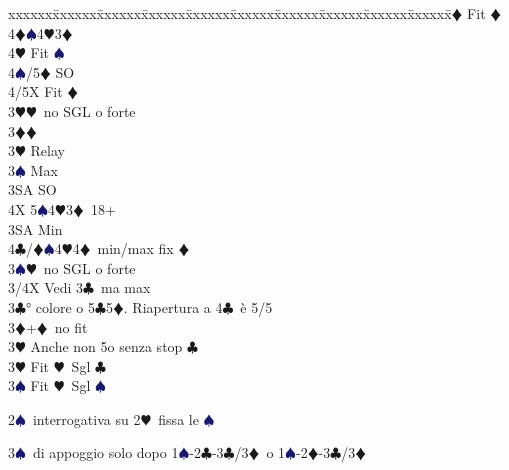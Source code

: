 \documentclass[a4paper,italian]{article}
\newcommand{\BC}{\textcolor{OliveGreen}{$\clubsuit$}}
\newcommand{\BD}{\textcolor{RedOrange}{$\vardiamondsuit$}}
\newcommand{\BH}{\textcolor{Red2}{$\varheartsuit${}}}
\newcommand{\BS}{\textcolor{MidnightBlue}{$\spadesuit${}}}
\newenvironment{bidtable}
{\begin{tabbing}

    xxxxxx\=xxxxxx\=xxxxxx\=xxxxxx\=xxxxxx\=xxxxxx\=xxxxxx\=xxxxxx\=xxxxxx\=xxxxxx\=\kill}
{\end{tabbing} }%
\newenvironment{varie}[1]
{\begin{tcolorbox}[colframe=green!40!black,title=#1]}
    {
\end{tcolorbox} }%
\begin{document}
\begin{multicols}{2}
\begin{bidtable}
                                            4\BD \> Fit \BD\-\\
                                            4\BD {}\BS 4\BH 3\BD\+\\
                                            4\BH \> Fit \BS\\
                                            4\BS/5\BD \> SO\\
                                            4/5X \> Fit \BD\-\-\\
                                            3\BH {}\BH\ no SGL o forte\-\\
                                            3\BD {}\BD \+\\
                                            3\BH \> Relay\+\\
                                            3\BS \> Max\+\\
                                            3SA \> SO\+\\
                                            4X 5\BS 4\BH 3\BD\ 18+\-\-\\
                                            3SA \> Min\\
                                            4\BC/\BD {}\BS 4\BH 4\BD\ min/max fix \BD \-\\
                                            3\BS {}\BH\ no SGL o forte\-\\
                                            3/4X \> Vedi 3\BC\ ma max\-\\
                                            3\BC {}° colore o 5\BC 5\BD . Riapertura a 4\BC\ è 5/5\\
                                            3\BD {}+\BD\ no fit\+\\
                                            3\BH \> Anche non 5o senza stop \BC\-\\
                                            3\BH \> Fit \BH\ Sgl \BC\\
                                            3\BS \> Fit \BH\ Sgl \BS\-\\
                                        \end{bidtable}
                                        \begin{varie}{Riepilogo mnemonico per i fissaggi}
                                            2\BS\ interrogativa su 2\BH\ fissa le \BS

                                            3\BS\ di appoggio solo dopo 1\BS-2\BC-3\BC/3\BD\ o 1\BS-2\BD-3\BC/3\BD


\end{varie}
\end{multicols}
\end{document}
